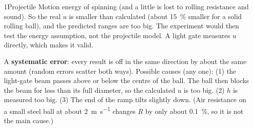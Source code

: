 \begin{chapteranswers}{1}{Projectile Motion}
        energy of spinning (and a little is lost to rolling resistance and sound). So the real
        $u$ is smaller than calculated (about \qty{15}{\percent} smaller for a solid rolling
        ball), and the predicted ranges are too big. The experiment would then test the energy
        assumption, not the projectile model. A light gate measures $u$ directly, which makes
        it valid.
  \item A \textbf{systematic error}: every result is off in the same direction by about the
        same amount (random errors scatter both ways). Possible causes (any one): (1) the
        light-gate beam passes above or below the centre of the ball. The ball then blocks the
        beam for less than its full diameter, so the calculated $u$ is too big. (2) $h$ is
        measured too big. (3) The end of the ramp tilts slightly down. (Air resistance on a small steel ball at about \qty{2}{m.s^{-1}}
        changes $R$ by only about \qty{0.1}{\percent}, so it is not the main cause.)
\end{chapteranswers}
